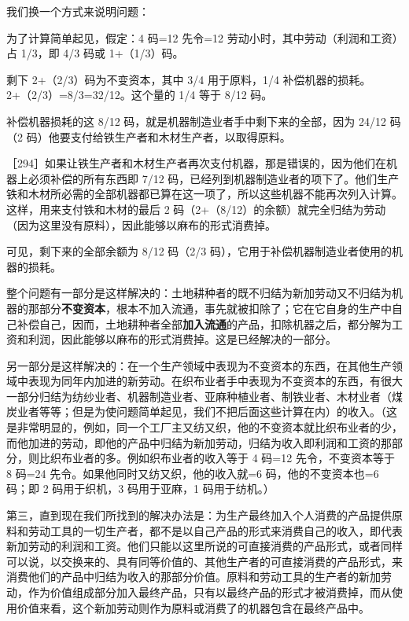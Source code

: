 我们换一个方式来说明问题：

\todo{}

为了计算简单起见，假定：4 码=12 先令=12 劳动小时，其中劳动（利润和工资）占 1/3，即 4/3 码或 1+（1/3）码。

剩下 2+（2/3）码为不变资本，其中 3/4 用于原料，1/4 补偿机器的损耗。2+（2/3）=8/3=32/12。这个量的 1/4 等于 8/12 码。

补偿机器损耗的这 8/12 码，就是机器制造业者手中剩下来的全部，因为 24/12 码（2 码）他要支付给铁生产者和木材生产者，以取得原料。

［294］如果让铁生产者和木材生产者再次支付机器，那是错误的，因为他们在机器上必须补偿的所有东西即 7/12 码，已经列到机器制造业者的项下了。他们生产铁和木材所必需的全部机器都已算在这一项了，所以这些机器不能再次列入计算。这样，用来支付铁和木材的最后 2 码（2+（8/12）的余额）就完全归结为劳动（因为这里没有原料），因此能够以麻布的形式消费掉。

可见，剩下来的全部余额为 8/12 码（2/3 码），它用于补偿机器制造业者使用的机器的损耗。

整个问题有一部分是这样解决的：土地耕种者的既不归结为新加劳动又不归结为机器的那部分\textbf{不变资本}，根本不加入流通，事先就被扣除了；它在它自身的生产中自己补偿自己，因而，土地耕种者全部\textbf{加入流通}的产品，扣除机器之后，都分解为工资和利润，因此能够以麻布的形式消费掉。这是已经解决的一部分。

另一部分是这样解决的：在一个生产领域中表现为不变资本的东西，在其他生产领域中表现为同年内加进的新劳动。在织布业者手中表现为不变资本的东西，有很大一部分归结为纺纱业者、机器制造业者、亚麻种植业者、制铁业者、木材业者（煤炭业者等等；但是为使问题简单起见，我们不把后面这些计算在内）的收入。（这是非常明显的，例如，同一个工厂主又纺又织，他的不变资本就比织布业者的少，而他加进的劳动，即他的产品中归结为新加劳动，归结为收入即利润和工资的那部分，则比织布业者的多。例如织布业者的收入等于 4 码=12 先令，不变资本等于 8 码=24 先令。如果他同时又纺又织，他的收入就=6 码，他的不变资本也=6 码；即 2 码用于织机，3 码用于亚麻，1 码用于纺机。）

第三，直到现在我们所找到的解决办法是：为生产最终加入个人消费的产品提供原料和劳动工具的一切生产者，都不是以自己产品的形式来消费自己的收入，即代表新加劳动的利润和工资。他们只能以这里所说的可直接消费的产品形式，或者同样可以说，以交换来的、具有同等价值的、其他生产者的可直接消费的产品形式，来消费他们的产品中归结为收入的那部分价值。原料和劳动工具的生产者的新加劳动，作为价值组成部分加入最终产品，只有以最终产品的形式才被消费掉，而从使用价值来看，这个新加劳动则作为原料或消费了的机器包含在最终产品中。

